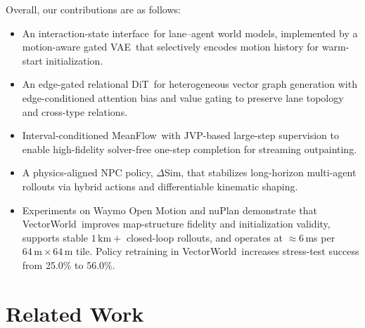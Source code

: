 \documentclass{article}
\newcommand{\VectorWorld}{VectorWorld}
\newcommand{\DeltaSim}{\(\Delta\)Sim}
\newcommand{\EdgeDiT}{edge-gated relational DiT}
\newcommand{\MotionVAE}{motion-aware gated VAE}
\newcommand{\MeanFlow}{MeanFlow}
\newcommand{\InteractionState}{interaction-state interface}
\theoremstyle{plain}
\theoremstyle{definition}
\theoremstyle{remark}
\begin{document}
Overall, our contributions are as follows:
\vspace{-3mm}
\begin{itemize}
    \item An \InteractionState\ for lane--agent world models, implemented by a \MotionVAE\ that selectively encodes motion history for warm-start initialization.
    \vspace{-2mm}
    \item An \EdgeDiT\ for heterogeneous vector graph generation with edge-conditioned attention bias and value gating to preserve lane topology and cross-type relations.
    \vspace{-2mm}
    \item Interval-conditioned \MeanFlow\ with JVP-based large-step supervision to enable high-fidelity solver-free one-step completion for streaming outpainting.
    \vspace{-2mm}
    \item A physics-aligned NPC policy, \DeltaSim, that stabilizes long-horizon multi-agent rollouts via hybrid actions and differentiable kinematic shaping.
    \vspace{-2mm}
    \item Experiments on Waymo Open Motion and nuPlan demonstrate that \VectorWorld\ improves map-structure fidelity and initialization validity, supports stable \(1\,\mathrm{km}+\) closed-loop rollouts, and operates at \(\approx 6\)\,ms per \(64\,\mathrm{m}\times 64\,\mathrm{m}\) tile. Policy retraining in \VectorWorld\ increases stress-test success from 25.0\% to 56.0\%.
\end{itemize}


\section{Related Work}
\end{document}

